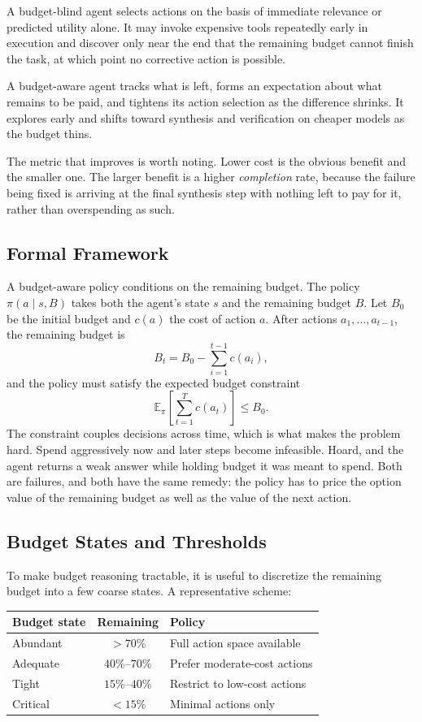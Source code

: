 \documentclass[11pt]{book}
\begin{document}
A budget-blind agent selects actions on the basis of immediate relevance or predicted utility alone. It may invoke expensive tools repeatedly early in execution and discover only near the end that the remaining budget cannot finish the task, at which point no corrective action is possible.

A budget-aware agent tracks what is left, forms an expectation about what remains to be paid, and tightens its action selection as the difference shrinks. It explores early and shifts toward synthesis and verification on cheaper models as the budget thins.

The metric that improves is worth noting. Lower cost is the obvious benefit and the smaller one. The larger benefit is a higher \textit{completion} rate, because the failure being fixed is arriving at the final synthesis step with nothing left to pay for it, rather than overspending as such.

\subsection{Formal Framework}

A budget-aware policy conditions on the remaining budget. The policy $\pi(a \mid s, B)$ takes both the agent's state $s$ and the remaining budget $B$. Let $B_0$ be the initial budget and $c(a)$ the cost of action $a$. After actions $a_1, \ldots, a_{t-1}$, the remaining budget is
\[
B_t = B_0 - \sum_{i=1}^{t-1} c(a_i),
\]
and the policy must satisfy the expected budget constraint
\[
\mathbb{E}_\pi\!\left[\sum_{t=1}^{T} c(a_t)\right] \leq B_0.
\]
The constraint couples decisions across time, which is what makes the problem hard. Spend aggressively now and later steps become infeasible. Hoard, and the agent returns a weak answer while holding budget it was meant to spend. Both are failures, and both have the same remedy: the policy has to price the option value of the remaining budget as well as the value of the next action.

\subsection{Budget States and Thresholds}

To make budget reasoning tractable, it is useful to discretize the remaining budget into a few coarse states. A representative scheme:

\begin{center}
\begin{tabular}{lcl}
\toprule
Budget state & Remaining & Policy \\
\midrule
Abundant & $> 70\%$ & Full action space available \\
Adequate & $40\%$--$70\%$ & Prefer moderate-cost actions \\
Tight & $15\%$--$40\%$ & Restrict to low-cost actions \\
Critical & $< 15\%$ & Minimal actions only \\
\bottomrule
\end{tabular}
\end{center}
\end{document}
